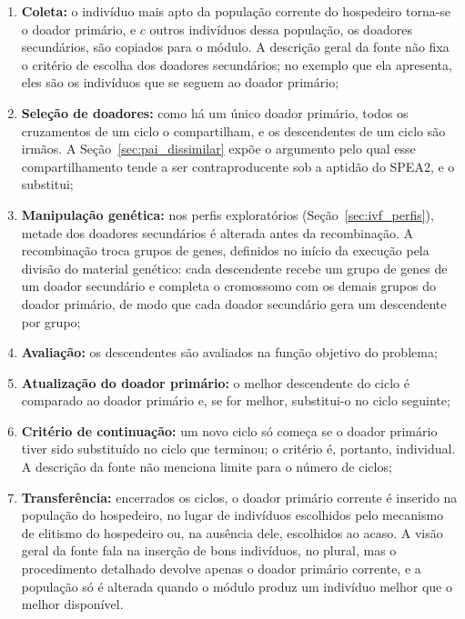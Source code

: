 \begin{enumerate}
    \item \textbf{Coleta:} o indivíduo mais apto da população corrente do hospedeiro torna-se o doador primário, e $c$ outros indivíduos dessa população, os doadores secundários, são copiados para o módulo. A descrição geral da fonte não fixa o critério de escolha dos doadores secundários; no exemplo que ela apresenta, eles são os indivíduos que se seguem ao doador primário;
        
    \item \textbf{Seleção de doadores:} como há um único doador primário, todos os cruzamentos de um ciclo o compartilham, e os descendentes de um ciclo são irmãos. A Seção~\ref{sec:pai_dissimilar} expõe o argumento pelo qual esse compartilhamento tende a ser contraproducente sob a aptidão do SPEA2, e o substitui;
        
    \item \textbf{Manipulação genética:} nos perfis exploratórios (Seção~\ref{sec:ivf_perfis}), metade dos doadores secundários é alterada antes da recombinação. A recombinação troca grupos de genes, definidos no início da execução pela divisão do material genético: cada descendente recebe um grupo de genes de um doador secundário e completa o cromossomo com os demais grupos do doador primário, de modo que cada doador secundário gera um descendente por grupo;
        
    \item \textbf{Avaliação:} os descendentes são avaliados na função objetivo do problema;
        
    \item \textbf{Atualização do doador primário:} o melhor descendente do ciclo é comparado ao doador primário e, se for melhor, substitui-o no ciclo seguinte;
        
    \item \textbf{Critério de continuação:} um novo ciclo só começa se o doador primário tiver sido substituído no ciclo que terminou; o critério é, portanto, individual. A descrição da fonte não menciona limite para o número de ciclos;
        
    \item \textbf{Transferência:} encerrados os ciclos, o doador primário corrente é inserido na população do hospedeiro, no lugar de indivíduos escolhidos pelo mecanismo de elitismo do hospedeiro ou, na ausência dele, escolhidos ao acaso. A visão geral da fonte fala na inserção de bons indivíduos, no plural, mas o procedimento detalhado devolve apenas o doador primário corrente, e a população só é alterada quando o módulo produz um indivíduo melhor que o melhor disponível.
\end{enumerate}

